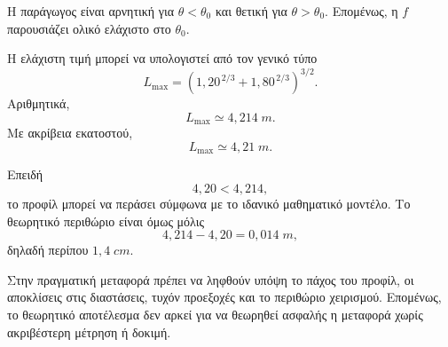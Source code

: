 \begin{alist}
        Η παράγωγος είναι αρνητική για $\theta<\theta_0$ και θετική για
        $\theta>\theta_0$. Επομένως, η $f$ παρουσιάζει ολικό ελάχιστο
        στο $\theta_0$.

        Η ελάχιστη τιμή μπορεί να υπολογιστεί από τον γενικό τύπο
        \[
          L_{\max}
          =\left(
          1{,}20^{\,2/3}+1{,}80^{\,2/3}
          \right)^{3/2}.
        \]
        Αριθμητικά,
        \[
          L_{\max}\simeq4{,}214\;\si{m}.
        \]
        Με ακρίβεια εκατοστού,
        \[
          {L_{\max}\simeq4{,}21\;\si{m}}.
        \]

  \item Επειδή
        \[
          4{,}20<4{,}214,
        \]
        το προφίλ μπορεί να περάσει σύμφωνα με το ιδανικό μαθηματικό
        μοντέλο. Το θεωρητικό περιθώριο είναι όμως μόλις
        \[
          4{,}214-4{,}20=0{,}014\;\si{m},
        \]
        δηλαδή περίπου $1{,}4\;\si{cm}$.

        Στην πραγματική μεταφορά πρέπει να ληφθούν υπόψη το πάχος του
        προφίλ, οι αποκλίσεις στις διαστάσεις, τυχόν προεξοχές και το
        περιθώριο χειρισμού. Επομένως, το θεωρητικό αποτέλεσμα δεν
        αρκεί για να θεωρηθεί ασφαλής η μεταφορά χωρίς ακριβέστερη
        μέτρηση ή δοκιμή.
\end{alist}
